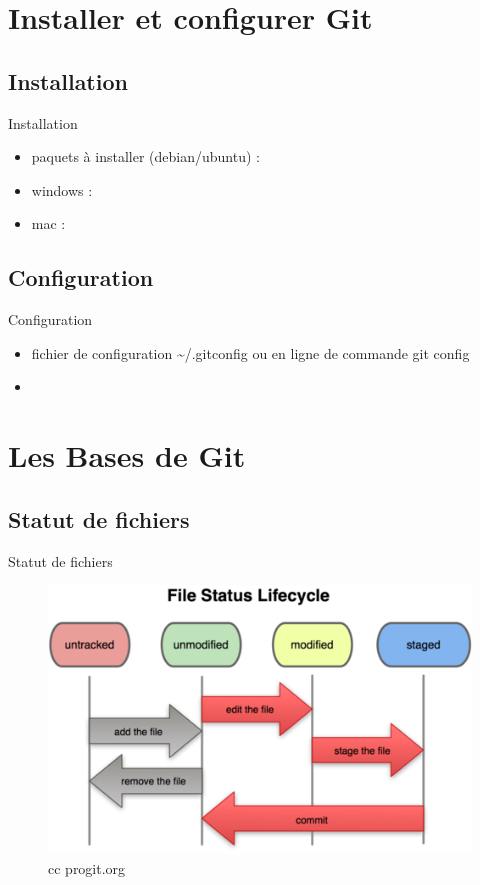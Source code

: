 \documentclass{beamer}
\begin{document}
\section{Installer et configurer Git}

\subsection*{Installation}
\begin{frame}{Installation}
  \begin{itemize}
  \item paquets à installer (debian/ubuntu) :
  \item windows :
  \item mac :
  \end{itemize}
\end{frame}

\subsection*{Configuration}
\begin{frame}{Configuration}
  \begin{itemize}
  \item fichier de configuration \textasciitilde/.gitconfig ou en ligne de commande git config
  \item 
  \end{itemize}
\end{frame}

\section{Les Bases de Git}
\subsection*{Statut de fichiers}
\begin{frame}{Statut de fichiers}
  \begin{figure}
    \begin{center}
      \includegraphics[scale=0.7]{Status_lifecycle.png}
    \end{center}
    \tiny
    \caption{cc progit.org}
    \label{cc progit.org}
  \end{figure}
\end{frame}
\end{document}
